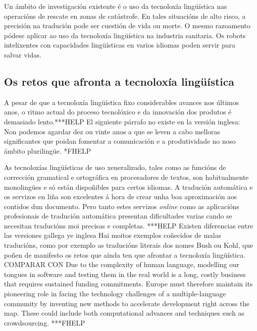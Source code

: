 \begin{multicols}{2}
Un ámbito de investigación existente é o uso da tecnoloxía lingüística nas operacións de rescate en zonas de catástrofe. En tales situacións de alto risco, a precisión na tradución pode ser cuestión de vida ou morte. O mesmo razoamento pódese aplicar ao uso da tecnoloxía lingüística na industria sanitaria. Os robots intelixentes con capacidades lingüísticas en varios idiomas poden servir para salvar vidas. 

\subsection{Os retos que afronta a tecnoloxía lingüística}

   A pesar de que a tecnoloxía lingüística fixo considerables avances nos últimos anos, o ritmo actual do proceso tecnolóxico e da innovación dos produtos é demasiado lento.***HELP El siguiente párrafo no existe en la versión inglesa: Non podemos agardar dez ou vinte anos a que se leven a cabo melloras significantes que poidan fomentar a comunicación e a produtividade no noso ámbito plurilingüe. *FHELP


 As tecnoloxías lingüísticas de uso xeneralizado, tales como as funcións de corrección gramatical e ortográfica en procesadores de textos, son habitualmente monolingües e só están dispoñibles para certos idiomas. A tradución automática e os servizos en liña son excelentes á hora de crear unha boa aproximación aos contidos dun documento. Pero tanto estes servizos \textit{online} como as aplicacións profesionais de tradución automática presentan dificultades varias cando se necesitan traducións moi precisas e completas.
***HELP Existen diferencias entre las versiones gallega ye inglesa 
Hai moitos exemplos coñecidos de malas traducións, como por exemplo as traducións literais dos nomes Bush ou Kohl, que poñen de manifesto os retos que aínda ten que afrontar a tecnoloxía lingüística.
COMPARAR CON
Due to the complexity of human language, modelling our tongues in software and testing them in the real world is a long, costly business that requires sustained funding commitments. Europe must therefore maintain its pioneering role in facing the technology challenges of a multiple-language community by inventing new methods to accelerate development right across the map. These could include both computational advances and techniques such as crowdsourcing.
***FHELP
 

\end{multicols}
